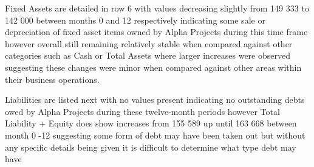  Fixed Assets are detailed in row 6 with values decreasing slightly from 149 333 to 142 000 between months 0 and 12 respectively indicating some sale or depreciation of fixed asset items owned by Alpha Projects during this time frame however overall still remaining relatively stable when compared against other categories such as Cash or Total Assets where larger increases were observed suggesting these changes were minor when compared against other areas within their business operations.  

 Liabilities are listed next with no values present indicating no outstanding debts owed by Alpha Projects during these twelve-month periods however Total Liability + Equity does show increases from 155 589 up until 163 668 between month 0 -12 suggesting some form of debt may have been taken out but without any specific details being given it is difficult to determine what type debt may have